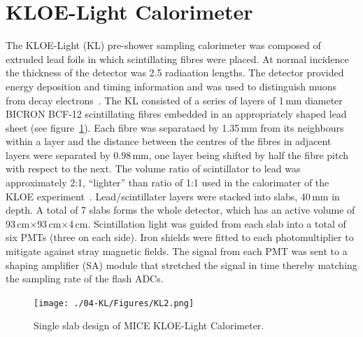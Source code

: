 \graphicspath{ {04-KL/Figures/} }

\section{KLOE-Light Calorimeter}
\label{Sect:KL}

The KLOE-Light (KL) pre-shower sampling calorimeter was composed of
extruded lead foils in which scintillating fibres were placed.
At normal incidence the thickness of the detector was 2.5 radiaation
lengths.
The detector provided energy deposition and timing information and was
used to distinguish muons from decay
electrons~\cite{2016JInst..11P3001A}.
The KL consisted of a series of layers of 1\,mm diameter BICRON BCF-12
scintillating fibres embedded in an appropriately shaped lead sheet
(see figure~\ref{fig:KL2}).
Each fibre was separataed by 1.35\,mm from its neighbours within a
layer and the distance between the centres of the fibres in adjacent
layers were separated by 0.98\,mm, one layer being shifted by half the
fibre pitch with respect to the next.
The volume ratio of scintillator to lead was approximately 2:1,
``lighter'' than ratio of 1:1 used in the calorimater of the KLOE
experiment~\cite{Ambrosino:2009zza}. 
Lead/scintillater layers were stacked into slabs, 40\,mm in depth.
A total of 7 slabs forms the whole detector, which has an active
volume of 93\,cm$\times$93\,cm$\times$4\,cm.
Scintillation light was guided from each slab into a total of six PMTs
(three on each side).
Iron shields were fitted to each photomultiplier to mitigate against
stray magnetic fields.
The signal from each PMT was sent to a shaping amplifier (SA) module
that stretched the signal in time thereby matching the sampling rate
of the flash ADCs.
\begin{figure}
  \begin{center}
    \texttt{[image: ./04-KL/Figures/KL2.png]}
    \caption{Single slab design of MICE KLOE-Light Calorimeter.}
    \label{fig:KL2}
  \end{center}
\end{figure}



